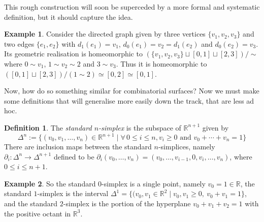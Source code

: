 \documentclass{tufte-handout}
\def\RR{\mathbb{R}}
\theoremstyle{definition}
\newtheorem{definition}{Definition}
\newtheorem{example}{Example}
\begin{document}
This rough construction will soon be superceded by a more formal and systematic definition, 
but it should capture the idea.

\begin{example}\label{eg:join_interval_geom_real}
Consider the directed graph given by three vertices $\{v_1,v_2,v_3\}$ and two edges 
$\{e_1,e_2\}$ with $d_1(e_1) = v_1$, $d_0(e_1) = v_2 = d_1(e_2)$ and $d_0(e_2) = v_3$. Its 
geometric realisation is homeomorphic to $(\{v_1,v_2,v_3\} \sqcup [0,1] \sqcup [2,3])/\!\sim$
where $0\sim v_1$, $1\sim v_2 \sim 2$ and $3\sim v_3$. Thus it is homeomorphic to 
$([0,1]\sqcup [2,3])/(1\sim 2) \simeq [0,2] \simeq [0,1]$.
\end{example}

Now, how do so something similar for combinatorial surfaces? Now we must make some definitions
that will generalise more easily down the track, that are less ad hoc.

\begin{definition}
The \emph{standard $n$-simplex} is the subspace of $\RR^{n+1}$ given by
\[
	\Delta^n := \{(v_0,v_1,\ldots,v_n) \in \RR^{n+1} \mid \forall\, 0\leq i\leq n, v_i\geq 0
			\text{ and } v_0+\cdots+v_n = 1\}
\]
There are inclusion maps between the standard $n$-simplices, namely $\partial_i\colon \Delta^n \to \Delta^{n+1}$
defined to be $\partial_i(v_0,\ldots,v_n) = (v_0,\ldots,v_{i-1},0,v_i,\ldots,v_n)$, where
$0\leq i \leq n+1$.
\end{definition}

\begin{example}
So  the standard $0$-simplex is a single point, namely $v_0=1\in \RR$, the standard $1$-simplex
is the interval $\Delta^1 = \{(v_0,v_1\in \RR^2\mid v_0,v_1 \geq0,\ v_0+v_1 = 1\}$, and the 
standard $2$-simplex is the portion of the hyperplane $v_0+v_1+v_2 = 1$ with the positive
octant in $\RR^3$. 
\end{example}
\end{document}
